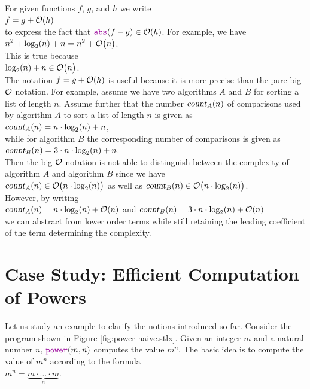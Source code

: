 For given functions $f$, $g$, and $h$ we write
\\[0.2cm]
\hspace*{1.3cm}
$f = g + \mathcal{O}(h)$
\\[0.2cm]
to express the fact that  $\mytt{abs}(f - g) \in \Oh(h)$.  For example, we have 
\\[0.2cm]
\hspace*{1.3cm}
$\displaystyle n^2 + \log_2(n) + n = n^2 + \mathcal{O}\bigl(n\bigr)$.
\\[0.2cm]
This is true because
\\[0.2cm]
\hspace*{1.3cm}
$\displaystyle \log_2(n) + n \in \mathcal{O}\bigl(n\bigr)$.
\\[0.2cm] 
The notation $f = g + \mathcal{O}(h)$ is useful because it is more precise than the pure big $\mathcal{O}$
notation.  For example, assume we have two algorithms $A$ and $B$ for sorting a list of length
$n$.  Assume further that the number $\textsl{count}_A(n)$ of comparisons used by algorithm $A$ to sort a list of
length $n$ is given as
\\[0.2cm]
\hspace*{1.3cm}
$\displaystyle\textsl{count}_A(n) = n \cdot \log_2(n) + n$,
\\[0.2cm]
while for algorithm $B$ the corresponding number of comparisons is given as
\\[0.2cm]
\hspace*{1.3cm}
$\displaystyle\textsl{count}_B(n) = 3 \cdot n \cdot \log_2(n) + n$.
\\[0.2cm]
Then the big $\mathcal{O}$ notation is not able to distinguish between the complexity of algorithm $A$ and
algorithm $B$ since we have
\\[0.2cm]
\hspace*{1.3cm}
$\textsl{count}_A(n) \in \mathcal{O}\bigl(n \cdot \log_2(n)\bigr)$ \quad as well as \quad
$\textsl{count}_B(n) \in \mathcal{O}\bigl(n \cdot \log_2(n)\bigr)$.
\\[0.2cm]
However, by writing
\\[0.2cm]
\hspace*{1.3cm}
$\displaystyle\textsl{count}_A(n) = n \cdot \log_2(n) + \mathcal{O}(n)$ \quad and \quad
$\displaystyle\textsl{count}_B(n) = 3 \cdot n \cdot \log_2(n) + \mathcal{O}(n)$
\\[0.2cm]
we can abstract from lower order terms while still retaining the leading coefficient of the term
determining the complexity.  

\section[Computation of Powers]{Case Study:  Efficient Computation of Powers}
Let us study an example to clarify the notions introduced so far.  
Consider the program shown in Figure \ref{fig:power-naive.stlx}.  Given an integer $m$ and a
natural number $n$, $\mytt{power}(m, n)$ computes the value $m^n$.
The basic idea is to compute the value of $m^n$ according to the formula \\[0.2cm]
\hspace*{1.3cm} 
$m^n = \underbrace{m \cdot {\dots} \cdot m}_n$. 


